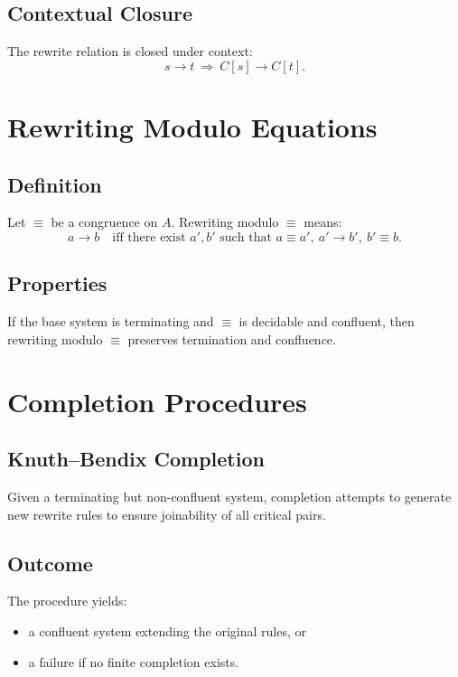 \subsection{Contextual Closure}

The rewrite relation is closed under context:
\[
s\to t \ \Rightarrow\ C[s] \to C[t].
\]

\section{Rewriting Modulo Equations}

\subsection{Definition}

Let $\equiv$ be a congruence on $A$.  
Rewriting modulo $\equiv$ means:
\[
a \to b \quad\text{iff there exist } a',b' \text{ such that }
a \equiv a',\ a'\to b',\ b'\equiv b.
\]

\subsection{Properties}

If the base system is terminating and $\equiv$ is decidable and confluent, then rewriting modulo $\equiv$ preserves termination and confluence.

\section{Completion Procedures}

\subsection{Knuth--Bendix Completion}

Given a terminating but non-confluent system, completion attempts to generate new rewrite rules to ensure joinability of all critical pairs.

\subsection{Outcome}

The procedure yields:
\begin{itemize}
\item a confluent system extending the original rules, or
\item a failure if no finite completion exists.
\end{itemize}

